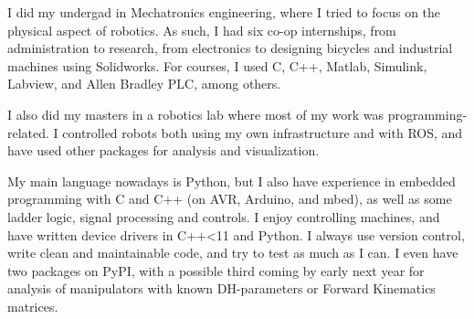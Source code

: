 I did my undergad in Mechatronics engineering, where I tried to focus on the physical aspect of robotics.
As such, I had six co-op internships, from administration to research, from electronics to designing bicycles and industrial machines using Solidworks.
For courses, I used C, C++, Matlab, Simulink, Labview, and Allen Bradley PLC, among others.

I also did my masters in a robotics lab where most of my work was programming-related.
I controlled robots both using my own infrastructure and with ROS, and have used other packages for analysis and visualization.

My main language nowadays is Python, but I also have experience in embedded programming with C and C++ (on AVR, Arduino, and mbed), as well as some ladder logic, signal processing and controls.
I enjoy controlling machines, and have written device drivers in C++<11 and Python.
I always use version control, write clean and maintainable code, and try to test as much as I can.
I even have two packages on PyPI, with a possible third coming by early next year for analysis of manipulators with known DH-parameters or Forward Kinematics matrices.
